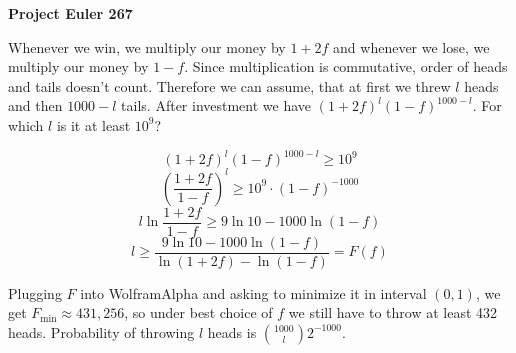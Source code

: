\documentclass[a4paper,12pt]{article}
\begin{document}
\setlength\parindent{0pt}
\textbf{Project Euler 267}
\vspace{5ex}

Whenever we win, we multiply our money by \(1 + 2f\) and whenever we lose, we multiply our money by \(1 - f\). Since multiplication is commutative, order of heads and tails doesn't count. Therefore we can assume, that at first we threw \(l\) heads and then \(1000 - l\) tails. After investment we have \((1 + 2f)^l(1 - f)^{1000 - l}\). For which \(l\) is it at least \(10^9\)?

\[(1 + 2f)^l (1 - f)^{1000 - l} \geq 10^9\]
\[\left( \frac{1 + 2f}{1 - f} \right)^l \geq 10^9 \cdot (1 - f)^{-1000}\]
\[l \ln{\frac{1 + 2f}{1 - f}} \geq 9 \ln{10} - 1000 \ln(1 - f)\]
\[l \geq \frac{9 \ln{10} - 1000 \ln(1 - f)}{\ln{(1 + 2f)} - \ln{(1 - f)}} = F(f)\]

Plugging \(F\) into WolframAlpha and asking to minimize it in interval \((0, 1)\), we get \(F_{\min} \approx 431{,}256\), so under best choice of \(f\) we still have to throw at least 432 heads. Probability of throwing \(l\) heads is \(\binom{1000}{l}2^{-1000}\).
\end{document}
